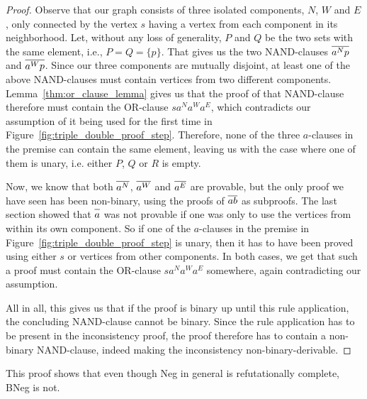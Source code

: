 \begin{proof}
Observe that our graph consists of three isolated components, $N$, $W$ and $E$, only connected by the vertex $s$ having a vertex from each component in its neighborhood.
Let, without any loss of generality, $P$ and $Q$ be the two sets with the same element, i.e., $P = Q = \{p\}$.
That gives us the two NAND-clauses $\ol{a^Np}$ and $\ol{a^Wp}$.
Since our three components are mutually disjoint, at least one of the above NAND-clauses must contain vertices from two different components.
Lemma~\ref{thm:or_clause_lemma} gives us that the proof of that NAND-clause therefore must contain the OR-clause $sa^Na^Wa^E$, which contradicts our assumption of it being used for the first time in Figure~\ref{fig:triple_double_proof_step}.
Therefore, none of the three $a$-clauses in the premise can contain the same element, leaving us with the case where one of them is unary, i.e. either $P$, $Q$ or $R$ is empty.

Now, we know that both $\ol{a^N}$, $\ol{a^W}$ and $\ol{a^E}$ are provable, but the only proof we have seen has been non-binary, using the proofs of $\ol{ab}$ as subproofs.
The last section showed that $\ol{a}$ was not provable if one was only to use the vertices from within its own component.
So if one of the $a$-clauses in the premise in Figure~\ref{fig:triple_double_proof_step} is unary, then it has to have been proved using either $s$ or vertices from other components.
In both cases, we get that such a proof must contain the OR-clause $sa^Na^Wa^E$ somewhere, again contradicting our assumption.

All in all, this gives us that if the proof is binary up until this rule application, the concluding NAND-clause cannot be binary.
Since the rule application has to be present in the inconsistency proof, the proof therefore has to contain a non-binary NAND-clause, indeed making the inconsistency non-binary-derivable.
\end{proof}

This proof shows that even though Neg in general is refutationally complete, BNeg is not.
